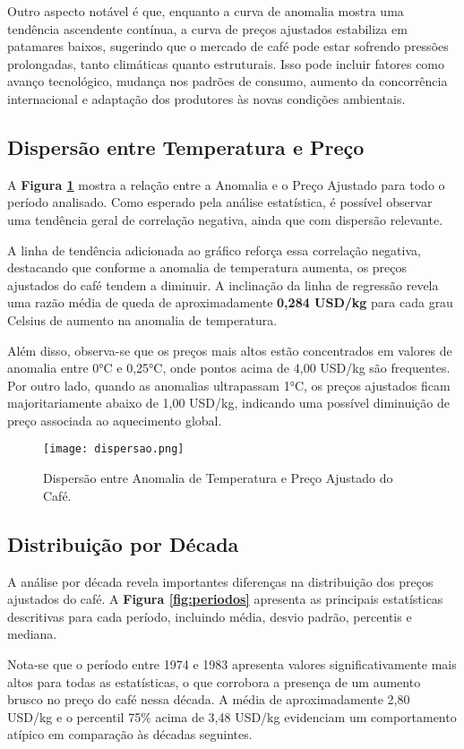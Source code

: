 \documentclass[12pt]{article}
\begin{document}
Outro aspecto notável é que, enquanto a curva de anomalia mostra uma tendência ascendente contínua, a curva de preços ajustados estabiliza em patamares baixos, sugerindo que o mercado de café pode estar sofrendo pressões prolongadas, tanto climáticas quanto estruturais. Isso pode incluir fatores como avanço tecnológico, mudança nos padrões de consumo, aumento da concorrência internacional e adaptação dos produtores às novas condições ambientais.

\subsection{Dispersão entre Temperatura e Preço}
A \textbf{Figura \ref{fig:dispersao}} mostra a relação entre a Anomalia e o Preço Ajustado para todo o período analisado. Como esperado pela análise estatística, é possível observar uma tendência geral de correlação negativa, ainda que com dispersão relevante.

A linha de tendência adicionada ao gráfico reforça essa correlação negativa, destacando que conforme a anomalia de temperatura aumenta, os preços ajustados do café tendem a diminuir. A inclinação da linha de regressão revela uma razão média de queda de aproximadamente \textbf{0,284 USD/kg} para cada grau Celsius de aumento na anomalia de temperatura.

Além disso, observa-se que os preços mais altos estão concentrados em valores de anomalia entre 0°C e 0,25°C, onde pontos acima de 4,00 USD/kg são frequentes. Por outro lado, quando as anomalias ultrapassam 1°C, os preços ajustados ficam majoritariamente abaixo de 1,00 USD/kg, indicando uma possível diminuição de preço associada ao aquecimento global.

\begin{figure}[ht]
\centering
\texttt{[image: dispersao.png]}
\caption{Dispersão entre Anomalia de Temperatura e Preço Ajustado do Café.}
\label{fig:dispersao}
\end{figure}

\subsection{Distribuição por Década}
A análise por década revela importantes diferenças na distribuição dos preços ajustados do café. A \textbf{Figura \ref{fig:periodos}} apresenta as principais estatísticas descritivas para cada período, incluindo média, desvio padrão, percentis e mediana.

Nota-se que o período entre 1974 e 1983 apresenta valores significativamente mais altos para todas as estatísticas, o que corrobora a presença de um aumento brusco no preço do café nessa década. A média de aproximadamente 2,80 USD/kg e o percentil 75\% acima de 3,48 USD/kg evidenciam um comportamento atípico em comparação às décadas seguintes.
\end{document}
